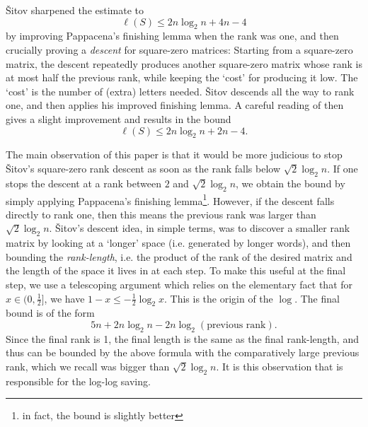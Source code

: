 \documentclass[11pt]{article}
\renewcommand{\leq}{\leqslant}
\newcommand{\C}{\mathbb{C}}
\newcommand{\calL}{\mathcal{L}}
\newcommand{\Mat}{\operatorname{Mat}}
\newtheorem{auxiliary proposition}[theorem]{Auxiliary Proposition}
\newtheorem{main conjecture}[theorem]{Main Conjecture}
\newtheorem{main theorem}[theorem]{Main Theorem}
\newtheorem{modesty proposition}[theorem]{Modesty Proposition}
\newtheorem{open problem}[theorem]{Open Problem}
\newtheorem{convergence lemma}[theorem]{Convergence Lemma}
\newtheorem{corrected lemma}[theorem]{Corrected Lemma}
\newtheorem{growth lemma}[theorem]{Growth Lemma}
\newtheorem{coefficient lemma}[theorem]{Integrality Lemma}
\newtheorem{interpolation lemma}[theorem]{Interpolation Lemma}
\newtheorem{kernel lemma}[theorem]{Kernel Lemma}
\newtheorem{limit lemma}[theorem]{Limit Lemma}
\newtheorem{tandem lemma}[theorem]{Modesty Lemma}
\newtheorem{zero-finding lemma}[theorem]{Zero-Finding Lemma}
\numberwithin{equation}{section}
\begin{document}
\v{S}itov \cite[Theorem~3 and Claim~14]{Shitov2019} sharpened the  estimate to
$$\ell(S)\leq 2n\log_2 n+4n-4 $$
by improving Pappacena's finishing lemma when the rank was one, and then crucially proving a \textit{descent} for square-zero matrices: Starting from a square-zero matrix, the descent repeatedly produces another square-zero matrix whose rank is at most half the previous rank, while keeping the `cost' for producing it low. The `cost' is the number of (extra) letters needed. \v{S}itov descends all the way to rank one, and then applies his improved finishing lemma. A careful reading of \cite[Proof of Theorem 3]{Shitov2019} then gives a slight improvement and results in the bound $$\ell(S)\leq 2n\log_2 n+2n-4. $$%

The main observation of this paper is that it would be more judicious to stop \v{S}itov's square-zero rank descent as soon as the rank falls below $\sqrt{2}\log_2 n.$ If one stops the descent at a rank between $2$ and $\sqrt{2}\log_2 n$, we obtain the bound by simply applying Pappacena's finishing lemma\footnote{in fact, the bound is slightly better}. However, if the descent falls directly to rank one, then this means the previous rank was larger than $\sqrt{2}\log_2 n$. \v{S}itov's descent idea, in simple terms, was to discover a smaller rank matrix by looking at a `longer' space (i.e. generated by longer words), and then bounding the \textit{rank-length}, i.e. the product of the rank of the desired matrix and the length of the space it lives in at each step. To make this useful at the final step, we use a telescoping argument which relies on the elementary fact that for $x\in(0,\frac{1}{2}]$, we have $ 1-x\leq -\frac{1}{2}\log_2 x$. This is the origin of the $\log$. %
The final bound  is of the form 
$$5n+2n\log_2 n-2n\log_2 (\text{previous rank}).$$ 
Since the final rank is 1, the final length is the same as the final rank-length, and thus can be bounded by the above formula with the comparatively large previous rank, which we recall was bigger than  $\sqrt{2}\log_2 n$. It is this observation that is responsible for the log-log saving. 
\end{document}
